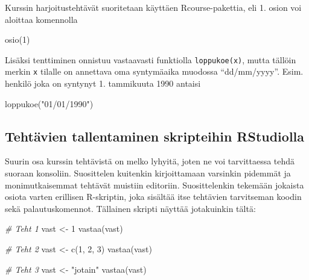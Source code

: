 \documentclass[
]{book}
\newenvironment{Shaded}{\begin{snugshade}}{\end{snugshade}}
\newcommand{\CommentTok}[1]{\textcolor[rgb]{0.56,0.35,0.01}{\textit{#1}}}
\newcommand{\DecValTok}[1]{\textcolor[rgb]{0.00,0.00,0.81}{#1}}
\newcommand{\FunctionTok}[1]{\textcolor[rgb]{0.00,0.00,0.00}{#1}}
\newcommand{\NormalTok}[1]{#1}
\newcommand{\OtherTok}[1]{\textcolor[rgb]{0.56,0.35,0.01}{#1}}
\newcommand{\StringTok}[1]{\textcolor[rgb]{0.31,0.60,0.02}{#1}}
\begin{document}
Kurssin harjoitustehtävät suoritetaan käyttäen Rcourse-pakettia, eli 1. osion voi aloittaa komennolla

\begin{Shaded}
\begin{Highlighting}[]
\FunctionTok{osio}\NormalTok{(}\DecValTok{1}\NormalTok{)}
\end{Highlighting}
\end{Shaded}

Lisäksi tenttiminen onnistuu vastaavasti funktiolla \texttt{loppukoe(x)}, mutta tällöin merkin \texttt{x} tilalle on annettava oma syntymäaika muodossa ``dd/mm/yyyy''. Esim. henkilö joka on syntynyt 1. tammikuuta 1990 antaisi

\begin{Shaded}
\begin{Highlighting}[]
\FunctionTok{loppukoe}\NormalTok{(}\StringTok{"01/01/1990"}\NormalTok{)}
\end{Highlighting}
\end{Shaded}

\hypertarget{tehtuxe4vien-tallentaminen-skripteihin-rstudiolla}{%
\subsection*{Tehtävien tallentaminen skripteihin RStudiolla}\label{tehtuxe4vien-tallentaminen-skripteihin-rstudiolla}}

Suurin osa kurssin tehtävistä on melko lyhyitä, joten ne voi tarvittaessa tehdä suoraan konsoliin. Suosittelen kuitenkin kirjoittamaan varsinkin pidemmät ja monimutkaisemmat tehtävät muistiin editoriin. Suosittelenkin tekemään jokaista osiota varten erillisen R-skriptin, joka sisältää itse tehtävien tarvitseman koodin sekä palautuskomennot. Tällainen skripti näyttää jotakuinkin tältä:

\begin{Shaded}
\begin{Highlighting}[]
\CommentTok{\# Teht 1}
\NormalTok{vast }\OtherTok{\textless{}{-}} \DecValTok{1}
\FunctionTok{vastaa}\NormalTok{(vast)}

\CommentTok{\# Teht 2}
\NormalTok{vast }\OtherTok{\textless{}{-}} \FunctionTok{c}\NormalTok{(}\DecValTok{1}\NormalTok{, }\DecValTok{2}\NormalTok{, }\DecValTok{3}\NormalTok{)}
\FunctionTok{vastaa}\NormalTok{(vast)}

\CommentTok{\# Teht 3}
\NormalTok{vast }\OtherTok{\textless{}{-}} \StringTok{"jotain"}
\FunctionTok{vastaa}\NormalTok{(vast)}
\end{Highlighting}
\end{Shaded}
\end{document}
